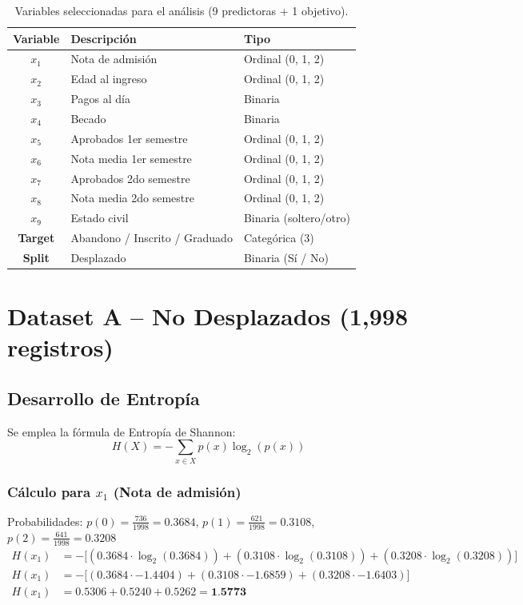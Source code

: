 \documentclass[12pt,a4paper]{article}
\begin{document}
\begin{table}[H]
    \centering
    \begin{tabular}{cll}
        \toprule
        \textbf{Variable} & \textbf{Descripción} & \textbf{Tipo} \\
        \midrule
        $x_1$ & Nota de admisión & Ordinal (0, 1, 2) \\
        $x_2$ & Edad al ingreso & Ordinal (0, 1, 2) \\
        $x_3$ & Pagos al día & Binaria \\
        $x_4$ & Becado & Binaria \\
        $x_5$ & Aprobados 1er semestre & Ordinal (0, 1, 2) \\
        $x_6$ & Nota media 1er semestre & Ordinal (0, 1, 2) \\
        $x_7$ & Aprobados 2do semestre & Ordinal (0, 1, 2) \\
        $x_8$ & Nota media 2do semestre & Ordinal (0, 1, 2) \\
        $x_9$ & Estado civil & Binaria (soltero/otro) \\
        \midrule
        \textbf{Target} & Abandono / Inscrito / Graduado & Categórica (3) \\
        \midrule
        \textbf{Split} & Desplazado & Binaria (Sí / No) \\
        \bottomrule
    \end{tabular}
    \caption{Variables seleccionadas para el análisis (9 predictoras + 1 objetivo).}
\end{table}

\section{Dataset A -- No Desplazados (1,998 registros)}

\subsection{Desarrollo de Entropía}

Se emplea la fórmula de Entropía de Shannon:
\begin{equation}
    H(X) = -\sum_{x \in X} p(x)\log_2(p(x))
\end{equation}

\subsubsection{Cálculo para $x_1$ (Nota de admisión)}
Probabilidades: $p(0) = \frac{736}{1998} = 0.3684$, $p(1) = \frac{621}{1998} = 0.3108$, $p(2) = \frac{641}{1998} = 0.3208$
\begin{align*}
    H(x_1) &= -\big[ (0.3684 \cdot \log_2(0.3684)) + (0.3108 \cdot \log_2(0.3108)) + (0.3208 \cdot \log_2(0.3208)) \big] \\
    H(x_1) &= -\big[ (0.3684 \cdot -1.4404) + (0.3108 \cdot -1.6859) + (0.3208 \cdot -1.6403) \big] \\
    H(x_1) &= 0.5306 + 0.5240 + 0.5262 = \textbf{1.5773}
\end{align*}
\end{document}
